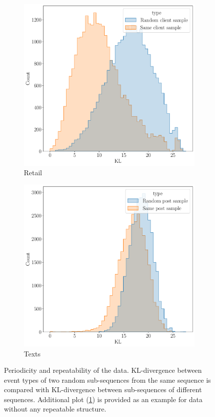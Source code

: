 \documentclass[sigconf]{acmart}
\begin{document}
\begin{figure}
\begin{subfigure}{0.25\linewidth}
  \end{subfigure}%
  \begin{subfigure}{0.25\linewidth}
    \caption{Retail}
    \includegraphics[width=\linewidth]{figures/kl_dis_retail.pdf}
  \end{subfigure}%
  \begin{subfigure}{0.25\linewidth}
    \caption{Texts}
    \centerline{\includegraphics[width=\linewidth]{figures/kl_dis_text.pdf}}
    \label{fig-subseq-kl-texts}
  \end{subfigure}
  \caption{
    Periodicity and repeatability of the data. KL-divergence between event types
    of two random sub-sequences from the same sequence is compared with KL-divergence
    between sub-sequences of different sequences. Additional plot (\ref{fig-subseq-kl-texts})
    is provided as an example for data without any repeatable structure.
  }
  \label{fig-subseq-kl}
\end{figure}
\end{document}

